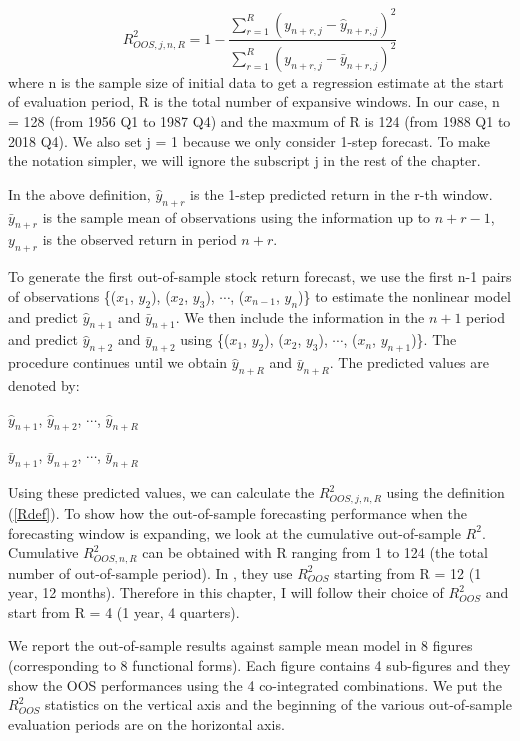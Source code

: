 \documentclass[a4paper,12pt,times,numbered,print,index]{report}
\numberwithin{equation}{section}
\begin{document}
\begin{equation}
    R_{O O S, j, n, R}^{2}=1-\frac{\sum_{r=1}^{R}\left(y_{n+r, j}-\widehat{y}_{n+r, j}\right)^{2}}{\sum_{r=1}^{R}\left(y_{n+r, j}-\bar{y}_{n+r, j}\right)^{2}}
    \label{Rdef}
\end{equation}
where n is the sample size of initial data to get a regression estimate at the start of evaluation period, R is the total number of expansive windows. In our case, n = 128 (from 1956 Q1 to 1987 Q4) and the maxmum of R is 124 (from 1988 Q1 to 2018 Q4). We also set j = 1 because we only consider 1-step forecast. To make the notation simpler, we will ignore the subscript j in the rest of the chapter.  

In the above definition, $\hat{y}_{n+r}$ is the 1-step predicted return in the r-th window. $\bar{y}_{n+r}$ is the sample mean of observations using the information up to $n+r-1$,  $y_{n+r}$ is the observed return in period $n+r$. 

To generate the first out-of-sample stock return forecast, we use the first n-1 pairs of observations \{($x_1$, $y_2$), ($x_2$, $y_3$), $\cdots$, ($x_{n-1}$, $y_{n}$)\} to estimate the nonlinear model and predict $\hat{y}_{n+1}$ and $\bar{y}_{n+1}$. 
We then include the information in the $n+1$ period and predict $\hat{y}_{n+2}$ and $\bar{y}_{n+2}$ using \{($x_1$, $y_2$), ($x_2$, $y_3$), $\cdots$, ($x_{n}$, $y_{n+1}$)\}. 
The procedure continues until we obtain $\hat{y}_{n+R}$ and $\bar{y}_{n+R}$. The predicted values are denoted by:
\begin{center}
	$\hat{y}_{n+1}$, $\hat{y}_{n+2}$, $\cdots$, $\hat{y}_{n+R}$
	
	$\bar{y}_{n+1}$, $\bar{y}_{n+2}$, $\cdots$, $\bar{y}_{n+R}$
\end{center}

Using these predicted values, we can calculate the $R_{O O S, j, n, R}^{2}$ using the definition (\ref{Rdef}). To show how the out-of-sample forecasting performance when the forecasting window is expanding, we look at the cumulative out-of-sample $R^2$.
Cumulative $R_{O O S, n, R}^{2}$ can be obtained with R ranging from 1 to 124 (the total number of out-of-sample period). In \cite{cheng2019nonparametric}, they use $R^2_{OOS}$ starting from R = 12 (1 year, 12 months). Therefore in this chapter, I will follow their choice of $R^2_{OOS}$ and start from R = 4 (1 year, 4 quarters). 

We report the out-of-sample results against sample mean model in 8 figures (corresponding to 8 functional forms). Each figure contains 4 sub-figures and they show the OOS performances using the 4 co-integrated combinations. We put the $R^2_{OOS}$ statistics on the vertical axis and the beginning of the various out-of-sample evaluation periods are on the horizontal axis. 
\end{document}
